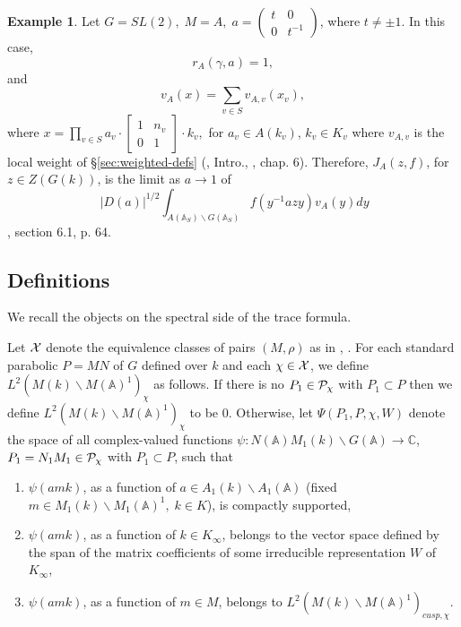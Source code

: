 \documentclass[12pt,letterpaper]{book}
\theoremstyle{plain}
\theoremstyle{definition}
\newtheorem{example}[theorem]{Example}
\theoremstyle{remark}
\theoremstyle{remark}
\begin{document}
\begin{example}
Let $G=SL(2),\;M=A,\;a=\left(
\begin{array}{cc}
t & 0 \\
0 & t^{-1}
\end{array}
\right) $, where $t\neq \pm 1$. In this case,
\[
r_A(\gamma ,a)=1,
\]
and
\[
v_A(x)=\sum_{v\in S}v_{A,v}(x_v),
\]
where $x=\prod_{v\in S}a_v\cdot \left[
\begin{array}{cc}
1 & n_v \\
0 & 1
\end{array}
\right] \cdot k_v,$ for
$a_v\in {A(k_v)}$, $k_v\in {K_v}$
where $v_{A,v}$ is the local weight of \S\ref{sec:weighted-defs}
(\cite{A6}, Intro., \cite{Sho}, chap. 6). Therefore,
$J_A(z,f)$, for $z\in Z(G(k))$,
is the limit as $a\rightarrow 1$ of
\begin{equation}
\ |D(a)|^{1/2}
\int_{A({\mathbb {A}}_S)\backslash G({\mathbb {A}}_S)}
f(y^{-1} az y)v_A(y)dy
\end{equation}
\cite{Sho}, section 6.1, p. 64.
\end{example}

\subsection{Definitions}

We recall the objects on the spectral side of the trace formula.


Let ${\cal X}$ denote the equivalence classes of pairs $(M,\rho)$ as in
\cite{A2}, \cite{A3}.
For each standard parabolic $P=MN$ of $G$ defined over $k$
and each $\chi \in {\cal X}$, we define
$L^2(M(k)\backslash M({\mathbb{A}})^1)_\chi $
as follows. If there is no $P_1\in {\cal P}_\chi $
with $P_1\subset P$ then we define
$L^2(M(k)\backslash M({\mathbb{A}})^1)_\chi $ to be $0$.
Otherwise, let
$\Psi (P_1,P,\chi,W )$ denote the space of
all complex-valued functions $\psi :N({\mathbb{A}})M_1(k)\backslash G(%
{\mathbb{A}})\rightarrow {\mathbb C}$, $P_1=N_1M_1\in {\cal P}_\chi $
with $P_1\subset P$, such that

\begin{enumerate}
\item  $\psi (amk)$, as a function of
$a\in A_1(k)\backslash A_1({\mathbb{A}})$ (fixed
$m\in M_1(k)\backslash M_1({\mathbb{A}})^1,\;k\in K$),
is compactly supported,

\item  $\psi (amk)$, as a function of $k\in K_\infty $, belongs to the
vector space defined by the span of the matrix coefficients of some
irreducible representation $W$ of $K_\infty $,

\item  $\psi (amk)$, as a function of $m\in M$, belongs to
$L^2(M(k)\backslash M({\mathbb{A}})^1)_{cusp,\chi }$.
\end{enumerate}
\end{document}

